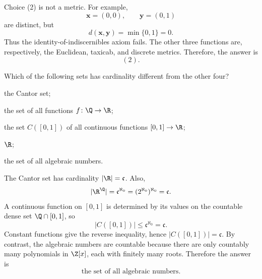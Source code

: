     \begin{solution}
        Choice (2) is not a metric. For example,
        \[
            \mathbf{x}=(0,0),
            \qquad
            \mathbf{y}=(0,1)
        \]
        are distinct, but
        \[
            d(\mathbf{x},\mathbf{y})
            =
            \min\{0,1\}
            =
            0.
        \]
        Thus the identity-of-indiscernibles axiom fails. The other three
        functions are, respectively, the Euclidean, taxicab, and discrete
        metrics. Therefore, the answer is
        \[
            \boxed{(2)}.
        \]
    \end{solution}

    \begin{expectedproblem}
        Which of the following sets has cardinality different from the other
        four?
        \begin{problemchoices}
            \item the Cantor set;
            \item the set of all functions $f\colon\Q\to\R$;
            \item the set $C([0,1])$ of all continuous functions
                  $[0,1]\to\R$;
            \item $\R$;
            \item the set of all algebraic numbers.
        \end{problemchoices}
    \end{expectedproblem}

    \begin{solution}
        The Cantor set has cardinality $|\R|=\mathfrak{c}$. Also,
        \[
            |\R^{\Q}|
            =
            \mathfrak{c}^{\aleph_0}
            =
            (2^{\aleph_0})^{\aleph_0}
            =
            \mathfrak{c}.
        \]
        A continuous function on $[0,1]$ is determined by its values on the
        countable dense set $\Q\cap[0,1]$, so
        \[
            |C([0,1])|\leq\mathfrak{c}^{\aleph_0}=\mathfrak{c}.
        \]
        Constant functions give the reverse inequality, hence
        $|C([0,1])|=\mathfrak{c}$. By contrast, the algebraic numbers are
        countable because there are only countably many polynomials in
        $\Z[x]$, each with finitely many roots. Therefore the answer is
        \[
            \boxed{\text{the set of all algebraic numbers}}.
        \]
    \end{solution}

